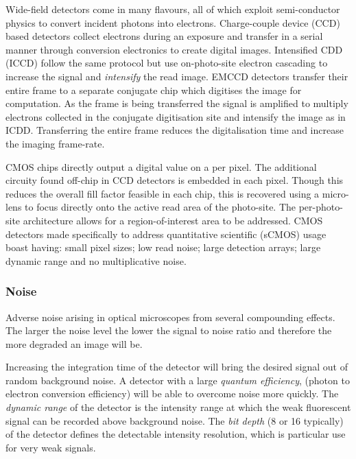 Wide-field detectors come in many flavours, all of which exploit semi-conductor physics to convert incident photons into electrons.
Charge-couple device (CCD) based detectors collect electrons during an exposure and transfer in a serial manner through conversion electronics to create digital images.
Intensified CDD (ICCD) follow the same protocol but use on-photo-site electron cascading to increase the signal and \emph{intensify} the read image.
EMCCD detectors transfer their entire frame to a separate conjugate chip which digitises the image for computation.
As the frame is being transferred the signal is amplified to multiply electrons collected in the conjugate digitisation site and intensify the image as in ICDD.
Transferring the entire frame reduces the digitalisation time and increase the imaging frame-rate.

CMOS chips directly output a digital value on a per pixel.
The additional circuity found off-chip in CCD detectors is embedded in each pixel.
Though this reduces the overall fill factor feasible in each chip, this is recovered using a micro-lens to focus directly onto the active read area of the photo-site.
The per-photo-site architecture allows for a region-of-interest area to be addressed.
CMOS detectors made specifically to address quantitative scientific (sCMOS) usage boast having: small pixel sizes; low read noise; large detection arrays; large dynamic range and no multiplicative noise.




\subsubsection{Noise}

Adverse noise arising in optical microscopes from several compounding effects.
The larger the noise level the lower the signal to noise ratio and therefore the more degraded an image will be.

Increasing the integration time of the detector will bring the desired signal out of random background noise.
A detector with a large \emph{quantum efficiency}, (photon to electron conversion efficiency) will be able to overcome noise more quickly.
The \emph{dynamic range} of the detector is the intensity range at which the weak fluorescent signal can be recorded above background noise.
The \emph{bit depth} (8 or \SI{16}{\bit} typically) of the detector defines the detectable intensity resolution, which is particular use for very weak signals.

